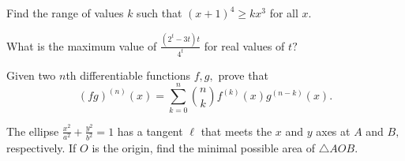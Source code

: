 \documentclass{article}
\begin{document}
\begin{prob}[Extension of C10]{2}
Find the range of values $k$ such that $(x+1)^4\geq kx^3$ for all $x.$
\end{prob}

\begin{prob}[AMC 12B 2020/22]{6}
What is the maximum value of $\frac{(2^t-3t)t}{4^t}$ for real values of $t?$
\end{prob}

\begin{req}{6}
Given two $n$th differentiable functions $f,g,$ prove that
\[(fg)^{(n)}(x)=\sum_{k=0}^{n}\binom{n}{k}f^{(k)}(x)g^{(n-k)}(x).\]
\end{req}

\begin{prob}[]{9}
The ellipse $\frac{x^2}{a^2}+\frac{y^2}{b^2}=1$ has a tangent $\ell$ that meets the $x$ and $y$ axes at $A$ and $B,$ respectively. If $O$ is the origin, find the minimal possible area of $\triangle AOB.$
\end{prob}

\end{document}
